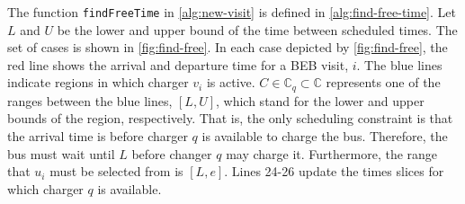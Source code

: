 \documentclass[11pt,a4paper,final]{article}
\newcommand{\C}{\mathbb{C}}                 %
\begin{document}
The function \texttt{findFreeTime} in \ref{alg:new-visit} is defined in \ref{alg:find-free-time}. Let \(L\) and \(U\) be the lower
and upper bound of the time between scheduled times. The set of cases is shown in \ref{fig:find-free}. In each case depicted
by \ref{fig:find-free}, the red line shows the arrival and departure time for a BEB visit, \(i\). The blue lines indicate
regions in which charger \(v_i\) is active. \(C \in \C_q \subset \C\) represents one of the ranges between the blue lines, \([L, U]\),
which stand for the lower and upper bounds of the region, respectively. That is, the only scheduling constraint is that
the arrival time is before charger \(q\) is available to charge the bus. Therefore, the bus must wait until \(L\) before
changer \(q\) may charge it. Furthermore, the range that \(u_i\) must be selected from is \([L,e]\). Lines 24-26 update the
times slices for which charger \(q\) is available.
\end{document}
